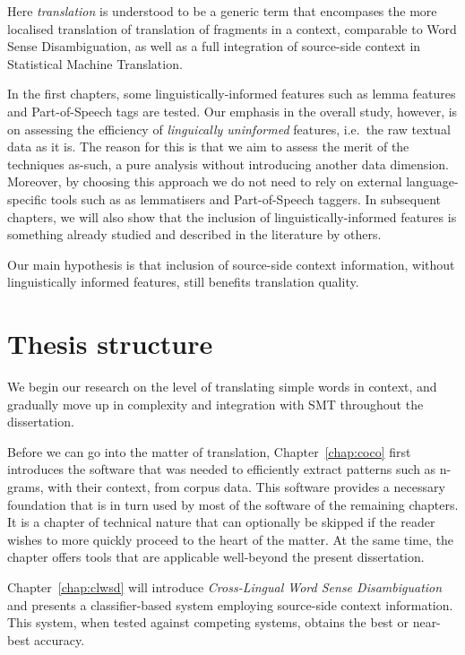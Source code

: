 Here \emph{translation} is understood to be a generic term that
encompases the more localised translation of translation of fragments in a
context, comparable to Word Sense Disambiguation, as well as a full integration
of source-side context in Statistical Machine Translation.

In the first chapters, some linguistically-informed features such as lemma
features and Part-of-Speech tags are tested. Our emphasis in the overall study,
however, is on assessing the efficiency of \emph{linguically uninformed}
features, i.e.\ the raw textual data as it is. The reason for this is that we
aim to assess the merit of the techniques as-such, a pure analysis without
introducing another data dimension. Moreover, by choosing this approach we do
not need to rely on external language-specific tools such as as lemmatisers and
Part-of-Speech taggers. In subsequent chapters, we will also show that the
inclusion of linguistically-informed features is something already studied and
described in the literature by others. 

Our main hypothesis is that inclusion of source-side context information, without
linguistically informed features, still benefits translation quality.

\section{Thesis structure}

We begin our research on the level of translating simple words in context, and
gradually move up in complexity and integration with SMT throughout the
dissertation.

Before we can go into the matter of translation, Chapter~\ref{chap:coco} first
introduces the software that was needed to efficiently extract patterns such as
n-grams, with their context, from corpus data. This software provides a
necessary foundation that is in turn used by most of the software of the
remaining chapters. It is a chapter of technical nature that can optionally be
skipped if the reader wishes to more quickly proceed to the heart of the
matter. At the same time, the chapter offers tools that are applicable
well-beyond the present dissertation.

Chapter~\ref{chap:clwsd} will introduce \emph{Cross-Lingual Word Sense
Disambiguation} and presents a classifier-based system employing source-side
context information. This system, when tested against competing systems, obtains the
best or near-best accuracy. 


